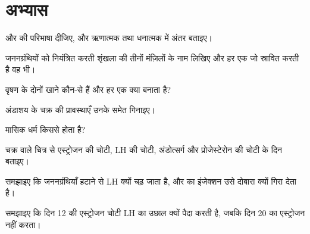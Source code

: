 \section{अभ्यास}

\begin{exercise}[$\star$]\label{exo:g11:hormones-and-reproduction:1}
 और  की परिभाषा दीजिए, और ऋणात्मक तथा धनात्मक
 में अंतर बताइए।
\end{exercise}

\begin{exercise}[$\star$]\label{exo:g11:hormones-and-reproduction:2}
जननग्रंथियों को नियंत्रित करती शृंखला की तीनों मंज़िलों के नाम लिखिए और हर
एक जो  स्रावित करती है वह भी।
\end{exercise}

\begin{exercise}[$\star$]\label{exo:g11:hormones-and-reproduction:3}
वृषण के दोनों खाने कौन-से हैं और हर एक क्या बनाता है?
\end{exercise}

\begin{exercise}[$\star$]\label{exo:g11:hormones-and-reproduction:4}
अंडाशय के चक्र की प्रावस्थाएँ उनके  समेत गिनाइए।
\end{exercise}

\begin{exercise}[$\star$]\label{exo:g11:hormones-and-reproduction:5}
मासिक धर्म किससे होता है?
\end{exercise}

\begin{exercise}[$\star\star$]\label{exo:g11:hormones-and-reproduction:6}
चक्र वाले चित्र से एस्ट्रोजन की चोटी, LH की चोटी, अंडोत्सर्ग और
प्रोजेस्टेरोन की चोटी के दिन बताइए।
\end{exercise}

\begin{exercise}[$\star\star$]\label{exo:g11:hormones-and-reproduction:7}
समझाइए कि जननग्रंथियाँ हटाने से LH क्यों चढ़ जाता है, और  का
इंजेक्शन उसे दोबारा क्यों गिरा देता है।
\end{exercise}

\begin{exercise}[$\star\star$]\label{exo:g11:hormones-and-reproduction:8}
समझाइए कि दिन 12 की एस्ट्रोजन चोटी LH का उछाल क्यों पैदा करती है, जबकि
दिन 20 का एस्ट्रोजन नहीं करता।
\end{exercise}

